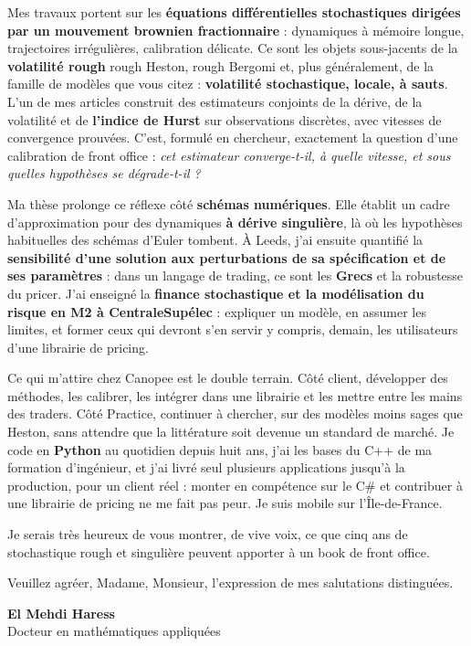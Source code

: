 \documentclass[10pt,a4paper]{article}
\newcommand{\cpp}{\mbox{C++}}
\begin{document}
Mes travaux portent sur les \textbf{équations différentielles stochastiques dirigées par un mouvement brownien
fractionnaire} : dynamiques à mémoire longue, trajectoires irrégulières, calibration délicate. Ce sont les
objets sous-jacents de la \textbf{volatilité rough} \textemdash{} rough Heston, rough Bergomi \textemdash{} et,
plus généralement, de la famille de modèles que vous citez : \textbf{volatilité stochastique, locale, à
sauts}. L'un de mes articles construit des estimateurs conjoints de la dérive, de la volatilité et de
\textbf{l'indice de Hurst} sur observations discrètes, avec vitesses de convergence prouvées. C'est, formulé
en chercheur, exactement la question d'une calibration de front office :
\emph{cet estimateur converge-t-il, à quelle vitesse, et sous quelles hypothèses se dégrade-t-il ?}

Ma thèse prolonge ce réflexe côté \textbf{schémas numériques}. Elle établit un cadre d'approximation pour des
dynamiques \textbf{à dérive singulière}, là où les hypothèses habituelles des schémas d'Euler tombent. À
Leeds, j'ai ensuite quantifié la \textbf{sensibilité d'une solution aux perturbations de sa spécification et
de ses paramètres} : dans un langage de trading, ce sont les \textbf{Grecs} et la robustesse du pricer. J'ai
enseigné la \textbf{finance stochastique et la modélisation du risque en M2 à CentraleSupélec} : expliquer un
modèle, en assumer les limites, et former ceux qui devront s'en servir \textemdash{} y compris, demain, les
utilisateurs d'une librairie de pricing.

Ce qui m'attire chez Canopee est le double terrain. Côté client, développer des méthodes, les calibrer, les
intégrer dans une librairie et les mettre entre les mains des traders. Côté Practice, continuer à chercher,
sur des modèles moins sages que Heston, sans attendre que la littérature soit devenue un standard de marché.
Je code en \textbf{Python} au quotidien depuis huit ans, j'ai les bases du \cpp{} de ma formation d'ingénieur,
et j'ai livré seul plusieurs applications jusqu'à la production, pour un client réel : monter en compétence
sur le C\# et contribuer à une librairie de pricing ne me fait pas peur. Je suis mobile sur l'Île-de-France.

Je serais très heureux de vous montrer, de vive voix, ce que cinq ans de stochastique rough et singulière
peuvent apporter à un book de front office.

Veuillez agréer, Madame, Monsieur, l'expression de mes salutations distinguées.

\vspace{2.6ex}

\hfill
\begin{minipage}{0.42\textwidth}
\raggedleft
{\headingfont\bfseries\small El Mehdi Haress}\\[0.2ex]
{\small\color{muted}Docteur en mathématiques appliquées}
\end{minipage}
\end{document}
